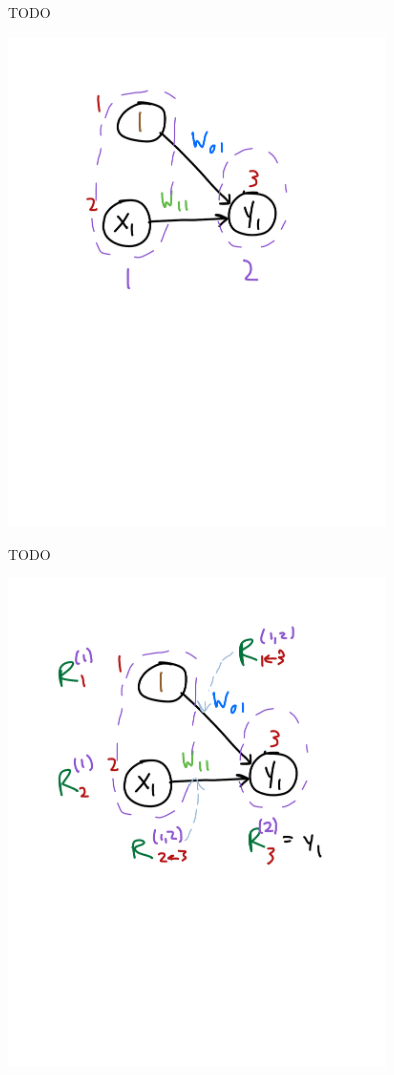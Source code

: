 \documentclass[xetex,compress]{beamer}
\begin{document}
\begin{frame}{TODO}
  \begin{center}
    \includegraphics[width=0.75\textwidth]{./figures/lr_nn_5.pdf}
  \end{center}
\end{frame}

\begin{frame}{TODO}
  \begin{center}
    \includegraphics[width=0.75\textwidth]{./figures/lr_nn_6.pdf}
  \end{center}
\end{frame}
\end{document}
